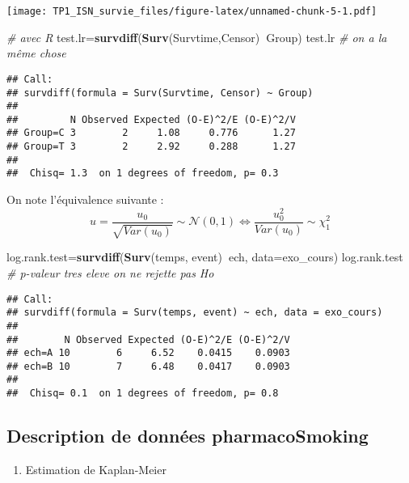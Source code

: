 \documentclass[
]{article}
\newenvironment{Shaded}{\begin{snugshade}}{\end{snugshade}}
\newcommand{\CommentTok}[1]{\textcolor[rgb]{0.56,0.35,0.01}{\textit{#1}}}
\newcommand{\DataTypeTok}[1]{\textcolor[rgb]{0.13,0.29,0.53}{#1}}
\newcommand{\KeywordTok}[1]{\textcolor[rgb]{0.13,0.29,0.53}{\textbf{#1}}}
\newcommand{\NormalTok}[1]{#1}
\newcommand{\OperatorTok}[1]{\textcolor[rgb]{0.81,0.36,0.00}{\textbf{#1}}}
\providecommand{\tightlist}{%
  \setlength{\itemsep}{0pt}\setlength{\parskip}{0pt}}
\begin{document}
\texttt{[image: TP1\_ISN\_survie\_files/figure-latex/unnamed-chunk-5-1.pdf]}

\begin{Shaded}
\begin{Highlighting}[]
\CommentTok{# avec R}
\NormalTok{test.lr=}\KeywordTok{survdiff}\NormalTok{(}\KeywordTok{Surv}\NormalTok{(Survtime,Censor)}\OperatorTok{~}\NormalTok{Group)}
\NormalTok{test.lr }\CommentTok{# on a la même chose}
\end{Highlighting}
\end{Shaded}

\begin{verbatim}
## Call:
## survdiff(formula = Surv(Survtime, Censor) ~ Group)
## 
##         N Observed Expected (O-E)^2/E (O-E)^2/V
## Group=C 3        2     1.08     0.776      1.27
## Group=T 3        2     2.92     0.288      1.27
## 
##  Chisq= 1.3  on 1 degrees of freedom, p= 0.3
\end{verbatim}

On note l'équivalence suivante :
\[u = \frac{u_0}{\sqrt{Var(u_0)}}\sim \mathcal{N}\left(0,1\right) \Leftrightarrow \frac{u_{0}^{2}}{Var(u_0)}\sim \chi^2_{1}\]

\begin{Shaded}
\begin{Highlighting}[]
\NormalTok{log.rank.test=}\KeywordTok{survdiff}\NormalTok{(}\KeywordTok{Surv}\NormalTok{(temps, event)}\OperatorTok{~}\NormalTok{ech, }\DataTypeTok{data=}\NormalTok{exo_cours)}
\NormalTok{log.rank.test }\CommentTok{# p-valeur tres eleve on ne rejette pas Ho}
\end{Highlighting}
\end{Shaded}

\begin{verbatim}
## Call:
## survdiff(formula = Surv(temps, event) ~ ech, data = exo_cours)
## 
##        N Observed Expected (O-E)^2/E (O-E)^2/V
## ech=A 10        6     6.52    0.0415    0.0903
## ech=B 10        7     6.48    0.0417    0.0903
## 
##  Chisq= 0.1  on 1 degrees of freedom, p= 0.8
\end{verbatim}

\hypertarget{description-de-donnuxe9es-pharmacosmoking}{%
\subsection{Description de données
pharmacoSmoking}\label{description-de-donnuxe9es-pharmacosmoking}}

\begin{enumerate}
\def\labelenumi{\arabic{enumi})}
\setcounter{enumi}{7}
\tightlist
\item
  Estimation de Kaplan-Meier
\end{enumerate}
\end{document}
